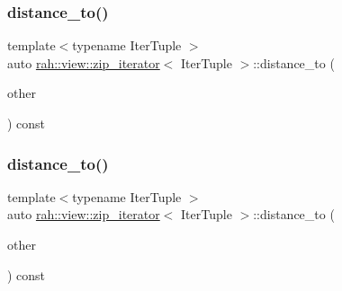 \subsubsection{\texorpdfstring{distance\_to()}{distance\_to()}\hspace{0.1cm}{\footnotesize\ttfamily [1/2]}}
{\footnotesize\ttfamily template$<$typename Iter\+Tuple $>$ \\
auto \mbox{\hyperlink{structrah_1_1view_1_1zip__iterator}{rah\+::view\+::zip\+\_\+iterator}}$<$ Iter\+Tuple $>$\+::distance\+\_\+to (\begin{DoxyParamCaption}\item[{\mbox{\hyperlink{structrah_1_1view_1_1zip__iterator}{zip\+\_\+iterator}}$<$ Iter\+Tuple $>$}]{other }\end{DoxyParamCaption}) const\hspace{0.3cm}{\ttfamily [inline]}}

\mbox{\label{structrah_1_1view_1_1zip__iterator_a01c298bede994df318d47205c50cc461}} 
\subsubsection{\texorpdfstring{distance\_to()}{distance\_to()}\hspace{0.1cm}{\footnotesize\ttfamily [2/2]}}
{\footnotesize\ttfamily template$<$typename Iter\+Tuple $>$ \\
auto \mbox{\hyperlink{structrah_1_1view_1_1zip__iterator}{rah\+::view\+::zip\+\_\+iterator}}$<$ Iter\+Tuple $>$\+::distance\+\_\+to (\begin{DoxyParamCaption}\item[{\mbox{\hyperlink{structrah_1_1view_1_1zip__iterator}{zip\+\_\+iterator}}$<$ Iter\+Tuple $>$}]{other }\end{DoxyParamCaption}) const\hspace{0.3cm}{\ttfamily [inline]}}

\mbox{\label{structrah_1_1view_1_1zip__iterator_ab8712d7266cdc63143e61841fa371179}} 
